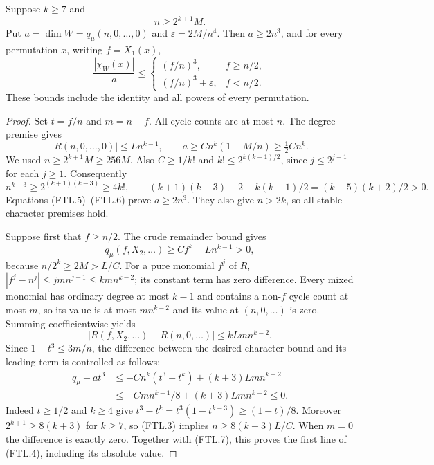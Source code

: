 \begin{lemma}[HD-FT04]
Suppose $k\ge7$ and
\[
                         n\ge2^{k+1}M.
 \tag{FTL.3}
\]
Put $a=\dim W=q_\mu(n,0,\ldots,0)$ and
$\varepsilon=2M/n^4$.  Then $a\ge2n^3$, and for every permutation
$x$, writing $f=X_1(x)$,
\[
 \frac{|\chi_W(x)|}{a}\le
 \begin{cases}
    (f/n)^3,& f\ge n/2,\\
    (f/n)^3+\varepsilon,& f<n/2.
 \end{cases}
 \tag{FTL.4}
\]
These bounds include the identity and all powers of every permutation.
\end{lemma}

\begin{proof}
Set $t=f/n$ and $m=n-f$.  All cycle counts are at most $n$.
The degree premise gives
\[
 |R(n,0,\ldots,0)|\le Ln^{k-1},\qquad
        a\ge Cn^k(1-M/n)\ge\tfrac12 Cn^k.
 \tag{FTL.5}
\]
We used $n\ge2^{k+1}M\ge256M$.  Also $C\ge1/k!$ and
$k!\le2^{k(k-1)/2}$, since $j\le2^{j-1}$ for each $j\ge1$.
Consequently
\[
 n^{k-3}\ge2^{(k+1)(k-3)}\ge4k!,
 \qquad
 (k+1)(k-3)-2-k(k-1)/2=(k-5)(k+2)/2>0.
 \tag{FTL.6}
\]
Equations (FTL.5)--(FTL.6) prove $a\ge2n^3$.
They also give $n>2k$, so all stable-character premises hold.

Suppose first that $f\ge n/2$.  The crude remainder bound gives
\[
 q_\mu(f,X_2,\ldots)\ge Cf^k-Ln^{k-1}>0,
 \tag{FTL.7}
\]
because $n/2^k\ge2M>L/C$.
For a pure monomial $f^j$ of $R$,
$|f^j-n^j|\le jmn^{j-1}\le k m n^{k-2}$; its constant term
has zero difference.  Every mixed monomial has ordinary degree at
most $k-1$ and contains a non-$f$ cycle count at most $m$, so its
value is at most $m n^{k-2}$ and its value at $(n,0,\ldots)$ is zero.
Summing coefficientwise yields
\[
 |R(f,X_2,\ldots)-R(n,0,\ldots)|\le k Lm n^{k-2}.
 \tag{FTL.8}
\]
Since $1-t^3\le3m/n$, the difference between the desired character
bound and its leading term is controlled as follows:
\[
 \begin{split}
 q_\mu-a t^3
 &\le-Cn^k(t^3-t^k)+(k+3)Lm n^{k-2}\\
 &\le-Cm n^{k-1}/8+(k+3)Lm n^{k-2}\le0.
 \end{split}
 \tag{FTL.9}
\]
Indeed $t\ge1/2$ and $k\ge4$ give
$t^3-t^k=t^3(1-t^{k-3})\ge(1-t)/8$.
Moreover $2^{k+1}\ge8(k+3)$ for $k\ge7$, so (FTL.3) implies
$n\ge8(k+3)L/C$.  When $m=0$ the difference is exactly zero.
Together with (FTL.7), this proves the first line of (FTL.4),
including its absolute value.


\end{proof}
